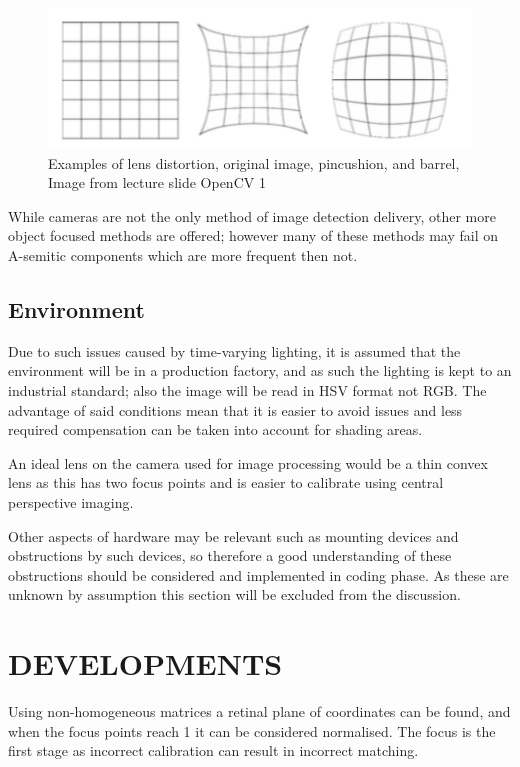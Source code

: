 \documentclass[a4paper, 10pt]{IEEEconf}
\begin{document}
\begin{figure}[H]
  \includegraphics[width=\linewidth,center]{images/lens}
  \caption{Examples of lens distortion, original image, pincushion, and barrel, Image from lecture slide OpenCV 1 \cite{Lecture1}}
  \label{fig:Examples of lens distortion, original image, pincushion, and barrel}
\end{figure}

While cameras are not the only method of image detection delivery, other more object focused methods are offered; however many of these methods may fail on A-semitic components which are more frequent then not.

\subsection{Environment}
Due to such issues caused by time-varying lighting, it is assumed that the environment will be in a production factory, and as such the lighting is kept to an industrial standard; also the image will be read in HSV format not RGB. The advantage of said conditions mean that it is easier to avoid issues and less required compensation can be taken into account for shading areas.

An ideal lens on the camera used for image processing would be a thin convex lens as this has two focus points and is easier to calibrate using central perspective imaging.

Other aspects of hardware may be relevant such as mounting devices and obstructions by such devices, so therefore a good  understanding of these obstructions should be considered and implemented in coding phase. As these are unknown by assumption this section will be excluded from the discussion.

\clearpage
\section{DEVELOPMENTS}
Using non-homogeneous matrices a retinal plane of coordinates can be found, and when the focus points reach 1 it can be considered normalised. The focus is the first stage as incorrect calibration can result in incorrect matching. 
\end{document}
